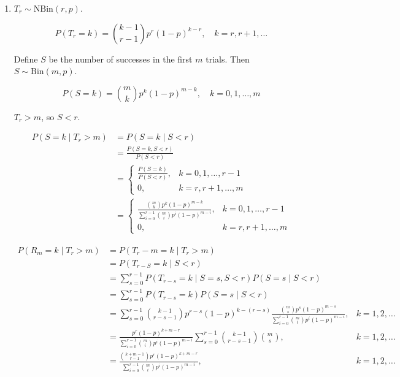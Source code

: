 \documentclass[a4paper]{article}
\begin{document}
\begin{enumerate}
    \item[(a)]
    
    $T_r \sim \text{NBin}(r, p)$.

    $$
    P(T_r = k) = \binom{k-1}{r-1} p^r (1-p)^{k-r}, \quad k = r, r+1, \dots
    $$

    Define $S$ be the number of successes in the first $m$ trials. Then $S \sim \text{Bin}(m, p)$.

    $$
    P(S = k) = \binom{m}{k} p^k (1-p)^{m-k}, \quad k = 0, 1, \dots, m
    $$

    $T_r > m$, so $S < r$.

    $$
    \begin{aligned}
    P(S = k \mid T_r > m)
    &= P(S = k \mid S < r) \\
    &= \frac{P(S = k, S < r)}{P(S < r)} \\
    &=
    \begin{cases}
        \frac{P(S = k)}{P(S < r)}, & k = 0, 1, \dots, r-1 \\
        0, & k = r, r+1, \dots, m
    \end{cases}
    \\
    &=
    \begin{cases}
        \frac{\binom{m}{k} p^k (1-p)^{m-k}}{\sum_{i=0}^{r-1} \binom{m}{i} p^i (1-p)^{m-i}}, & k = 0, 1, \dots, r-1 \\
        0, & k = r, r+1, \dots, m
    \end{cases}
    \end{aligned}
    $$

    $$
    \begin{aligned}
    P(R_m = k \mid T_r > m)
    &= P(T_r - m = k \mid T_r > m) \\
    &= P(T_{r - S} = k \mid S < r) \\
    &= \sum_{s=0}^{r-1} P(T_{r - s} = k \mid S = s, S < r) P(S = s \mid S < r) \\
    &= \sum_{s=0}^{r-1} P(T_{r - s} = k) P(S = s \mid S < r) \\
    &=
    \sum_{s=0}^{r-1} \binom{k-1}{r-s-1} p^{r-s} (1-p)^{k-(r-s)} \frac{\binom{m}{s} p^s (1-p)^{m-s}}{\sum_{i=0}^{r-1} \binom{m}{i} p^i (1-p)^{m-i}}, & k = 1, 2, \dots \\
    &=
    \frac{p^r (1-p)^{k+m-r}}{\sum_{i=0}^{r-1} \binom{m}{i} p^i (1-p)^{m-i}} \sum_{s=0}^{r-1} \binom{k-1}{r-s-1} \binom{m}{s} , & k = 1, 2, \dots \\
    &=
    \frac{\binom{k+m-1}{r-1} p^r (1-p)^{k+m-r}}{\sum_{i=0}^{r-1} \binom{m}{i} p^i (1-p)^{m-i}}, & k = 1, 2, \dots 
    \end{aligned}
    $$


\end{enumerate}
\end{document}
